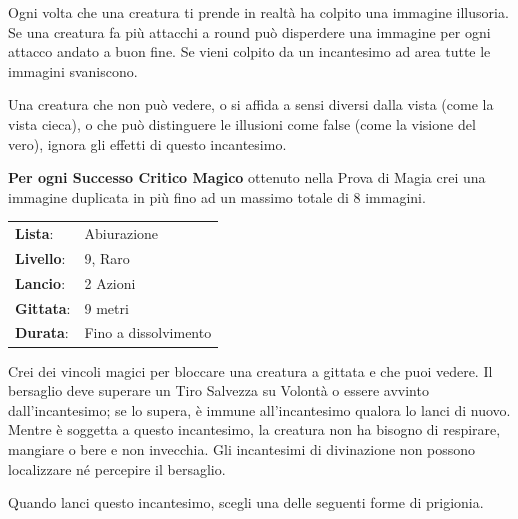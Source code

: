 \begin{multicols}{2}
Ogni volta che una creatura ti prende in realtà ha colpito una immagine illusoria.
Se una creatura fa più attacchi a round può disperdere una immagine per ogni attacco andato a buon fine. Se vieni colpito da un incantesimo ad area tutte le immagini svaniscono.

Una creatura che non può vedere, o si affida a sensi diversi dalla vista (come la vista cieca), o che può distinguere le illusioni come false (come la visione del vero), ignora gli effetti di questo incantesimo.

\textbf{Per ogni Successo Critico Magico} ottenuto nella Prova di Magia crei una immagine duplicata in più fino ad un massimo totale di 8 immagini.

\noindent\begin{tabularx}{\linewidth}{p{1.3cm}X}
	\rowcolor{gray!20}\textbf{Lista}: & Abiurazione \\
	\textbf{Livello}: & 9, Raro \\
	\rowcolor{gray!20}\textbf{Lancio}: & 2 Azioni \\
	\textbf{Gittata}: & 9 metri \\
	\rowcolor{gray!20}\textbf{Durata}: & Fino a dissolvimento \\
\end{tabularx}\smallskip

Crei dei vincoli magici per bloccare una creatura a gittata e che puoi vedere. Il bersaglio deve superare un Tiro Salvezza su Volontà o essere avvinto dall'incantesimo; se lo supera, è immune all'incantesimo qualora lo lanci di nuovo. Mentre è soggetta a questo incantesimo, la creatura non ha bisogno di respirare, mangiare o bere e non invecchia. Gli incantesimi di divinazione non possono localizzare né percepire il bersaglio.

Quando lanci questo incantesimo, scegli una delle seguenti forme di prigionia.


\end{multicols}
